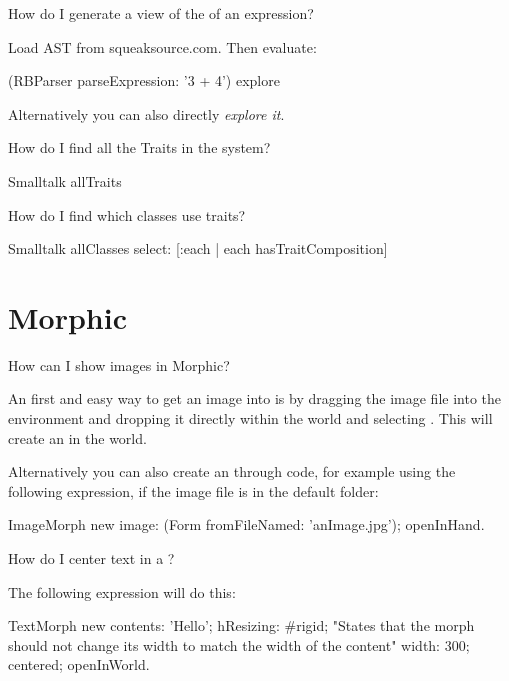 \documentclass[a4paper,10pt,twoside]{book}
\begin{document}
\begin{faq}
How do I generate a view of the  of an expression?
\end{faq}
\answer
Load AST from squeaksource.com. Then evaluate:
\begin{code}{}
(RBParser parseExpression: '3 + 4') explore
\end{code}
Alternatively you can also directly \emph{explore it}.

\begin{faq}
How do I find all the Traits in the system?
\end{faq}
\answer
\begin{code}{}
Smalltalk allTraits
\end{code}

\begin{faq}
How do I find which classes use traits?
\end{faq}
\answer
\begin{code}{}
Smalltalk allClasses select: [:each | each hasTraitComposition]
\end{code}

\section{Morphic}
\begin{faq}
How can I show images in Morphic?
\end{faq}
\answer
An first and easy way to get an image into \sq is by dragging the image file into the environment and dropping it directly within the world and selecting .
This will create an  in the world.

\noindent Alternatively you can also create an  through code, for example using the following expression, if the image file is in the default folder:
\begin{code}{}
ImageMorph new
    image: (Form fromFileNamed: 'anImage.jpg');
    openInHand.
\end{code}  

\begin{faq}
How do I center text in a ?
\end{faq}
\answer
The following expression will do this:
\begin{code}{}
TextMorph new
    contents: 'Hello';
    hResizing: #rigid; "States that the morph should not change 
                        its width to match the width of the content"
    width: 300;
    centered;
    openInWorld.
\end{code}  
\end{document}
